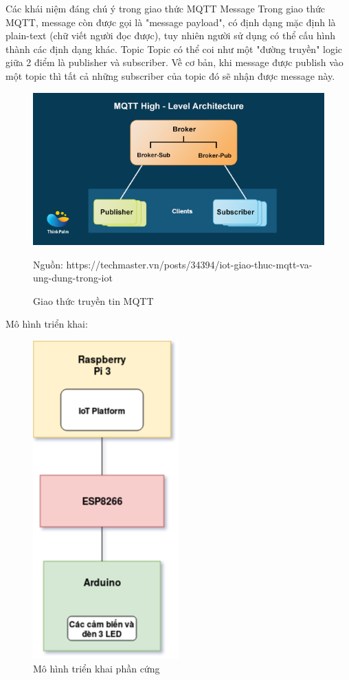 Các khái niệm đáng chú ý trong giao thức MQTT
Message
Trong giao thức MQTT, message còn được gọi là "message payload", có định dạng mặc định là plain-text (chữ viết người đọc được), tuy nhiên người sử dụng có thể cấu hình thành các định dạng khác.
Topic
Topic có thể coi như một "đường truyền" logic giữa 2 điểm là publisher và subscriber. Về cơ bản, khi message được publish vào một topic thì tất cả những subscriber của topic đó sẽ nhận được message này.
\begin{figure}[h]
	\center
	\includegraphics[scale=0.6]{image/mqtt}\\
	\caption{Giao thức truyền tin MQTT}
	Nguồn: https://techmaster.vn/posts/34394/iot-giao-thuc-mqtt-va-ung-dung-trong-iot
\end{figure}
Mô hình triển khai:
\clearpage
\begin{figure}[h!]
	\center
	\includegraphics[scale=0.6]{image/mo_hinh_trien_khai_phan_cung}
	\caption{Mô hình triển khai phần cứng}
	
	\label{fig:mo_hinh_trien_khai_phan_cung}
\end{figure}

